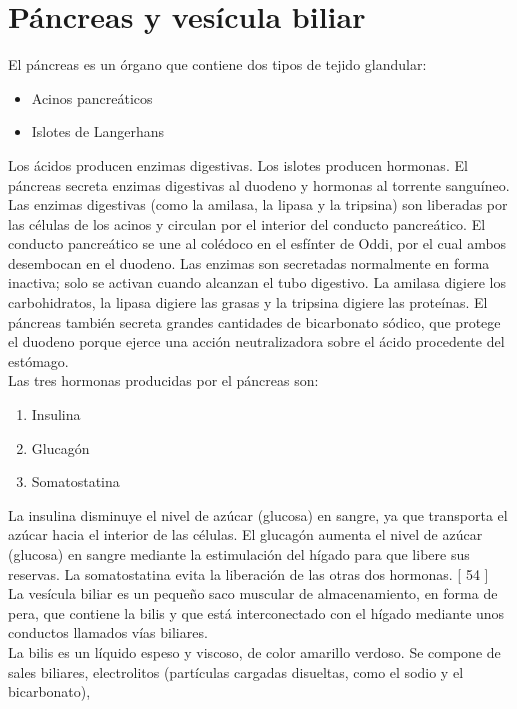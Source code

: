\section{Páncreas y vesícula biliar}
El páncreas es un órgano que contiene dos tipos de tejido glandular:\\
\begin{itemize}
    \item Acinos pancreáticos
    \item Islotes de Langerhans    
\end{itemize}
Los ácidos producen enzimas digestivas. Los islotes producen hormonas. El páncreas secreta enzimas digestivas al duodeno y hormonas al torrente sanguíneo.\\
Las enzimas digestivas (como la amilasa, la lipasa y la tripsina) son liberadas por las células de los acinos y circulan por el interior del conducto pancreático. 
El conducto pancreático se une al colédoco en el esfínter de Oddi, por el cual ambos desembocan en el duodeno. Las enzimas son secretadas normalmente en forma inactiva; 
solo se activan cuando alcanzan el tubo digestivo. La amilasa digiere los carbohidratos, la lipasa digiere las grasas y la tripsina digiere las proteínas. El páncreas 
también secreta grandes cantidades de bicarbonato sódico, que protege el duodeno porque ejerce una acción neutralizadora sobre el ácido procedente del estómago.\\
Las tres hormonas producidas por el páncreas son:\\
\begin{enumerate}
    \item Insulina
    \item Glucagón
    \item Somatostatina    
\end{enumerate}
La insulina disminuye el nivel de azúcar (glucosa) en sangre, ya que transporta el azúcar hacia el interior de las células. El glucagón aumenta el nivel de azúcar (glucosa) 
en sangre mediante la estimulación del hígado para que libere sus reservas. La somatostatina evita la liberación de las otras dos hormonas. [ 54 ]\\
La vesícula biliar es un pequeño saco muscular de almacenamiento, en forma de pera, que contiene la bilis y que está interconectado con el hígado mediante unos conductos 
llamados vías biliares.\\
La bilis es un líquido espeso y viscoso, de color amarillo verdoso. Se compone de sales biliares, electrolitos (partículas cargadas disueltas, como el sodio y el bicarbonato), 
